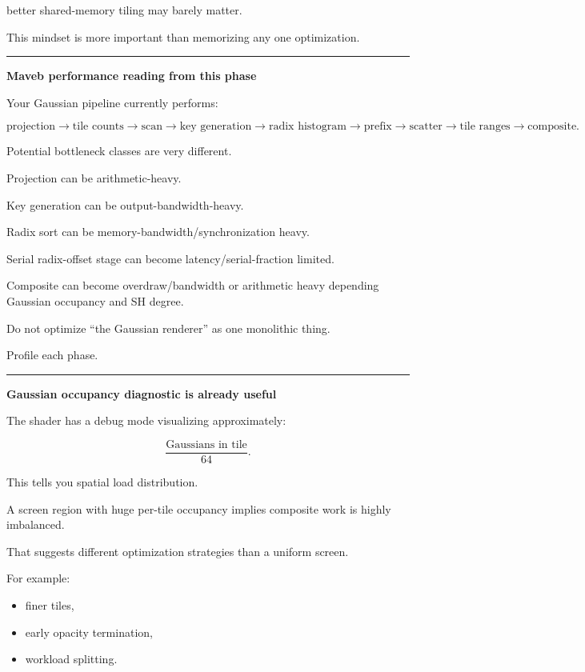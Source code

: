 better shared-memory tiling may barely matter.

This mindset is more important than memorizing any one optimization.

\begin{center}\rule{0.5\linewidth}{0.5pt}\end{center}

\textbf{Maveb performance reading from this phase}

Your Gaussian pipeline currently performs:

\[
\text{projection}
\rightarrow
\text{tile counts}
\rightarrow
\text{scan}
\rightarrow
\text{key generation}
\rightarrow
\text{radix histogram}
\rightarrow
\text{prefix}
\rightarrow
\text{scatter}
\rightarrow
\text{tile ranges}
\rightarrow
\text{composite}.
\]

Potential bottleneck classes are very different.

Projection can be arithmetic-heavy.

Key generation can be output-bandwidth-heavy.

Radix sort can be memory-bandwidth/synchronization heavy.

Serial radix-offset stage can become latency/serial-fraction limited.

Composite can become overdraw/bandwidth or arithmetic heavy depending Gaussian occupancy and SH degree.

Do not optimize ``the Gaussian renderer'' as one monolithic thing.

Profile each phase.

\begin{center}\rule{0.5\linewidth}{0.5pt}\end{center}

\textbf{Gaussian occupancy diagnostic is already useful}

The shader has a debug mode visualizing approximately:

\[
\frac{
\text{Gaussians in tile}
}{
64
}.
\]

This tells you spatial load distribution.

A screen region with huge per-tile occupancy implies composite work is highly imbalanced.

That suggests different optimization strategies than a uniform screen.

For example:

\begin{itemize}
\tightlist
\item
  finer tiles,
\item
  early opacity termination,
\item
  workload splitting.
\end{itemize}

